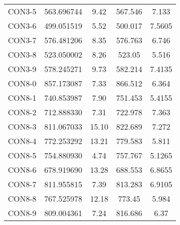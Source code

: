 \begin{table}[ht]
\begin{tabular}{c c c c c}
CON3-5 & 563.696744 & 9.42 & 567.546 & 7.133 \\
CON3-6 & 499.051519 & 5.52 & 500.017 & 7.5605 \\
CON3-7 & 576.481206 & 8.35 & 576.763 & 6.746 \\
CON3-8 & 523.050002 & 8.26 & 523.05 & 5.516 \\
CON3-9 & 578.245271 & 9.73 & 582.214 & 7.4135 \\
CON8-0 & 857.173087 & 7.33 & 866.512 & 6.364 \\
CON8-1 & 740.853987 & 7.90 & 751.453 & 5.4155 \\
CON8-2 & 712.888330 & 7.31 & 722.978 & 7.363 \\
CON8-3 & 811.067033 & 15.10 & 822.689 & 7.272 \\
CON8-4 & 772.253292 & 13.21 & 779.583 & 5.811 \\
CON8-5 & 754.880930 & 4.74 & 757.767 & 5.1265 \\
CON8-6 & 678.919690 & 13.28 & 688.553 & 6.8655 \\
CON8-7 & 811.955815 & 7.39 & 813.283 & 6.9105 \\
CON8-8 & 767.525978 & 12.18 & 773.45 & 5.984 \\
CON8-9 & 809.004361 & 7.24 & 816.686 & 6.37 \\
[1ex]\hline
\end{tabular}
\label{table:nonlin}
\end{table} \clearpage
